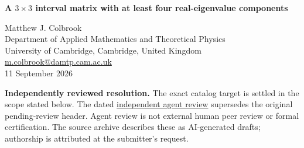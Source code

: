 \documentclass[11pt,a4paper]{article}
\theoremstyle{remark}\newtheorem{remark}[theorem]{Remark}
\newcommand{\header}[2]{\begin{center}{\Large\bfseries #1\par}\vspace{6pt}{\small #2\par}\end{center}\vspace{6pt}}
\begin{document}
\header{A $3\times3$ interval matrix with at least four real-eigenvalue components}{Repository IV-06. Claimed counterexample; independent review pending.}
\begin{center}Matthew J. Colbrook\\{\small Department of Applied Mathematics and Theoretical Physics\\University of Cambridge, Cambridge, United Kingdom\\\href{mailto:m.colbrook@damtp.cam.ac.uk}{m.colbrook@damtp.cam.ac.uk}}\\11 September 2026\end{center}
\textbf{Independently reviewed resolution.} The exact catalog target is settled in the scope stated below.
The dated \href{https://github.com/MColbrook/OpenProblemsInNLA/blob/codex/colbrook-package-submissions/references/colbrook-intervals-2026-09-11/verification/reviews/IV-06-review.md}{independent agent review} supersedes the original pending-review header. Agent review is not external human peer review or formal certification. The source archive describes these as AI-generated drafts; authorship is attributed at the submitter's request.
\par\medskip
\begin{abstract}
A two-parameter interval matrix with integer endpoints has at least four connected components in its real eigenvalue set. Four exact eigenpairs and three exact excluded real numbers provide a short certificate. This disproves the proposed bound of $n$ components for a general $n\times n$ interval matrix.
\end{abstract}
\end{document}
